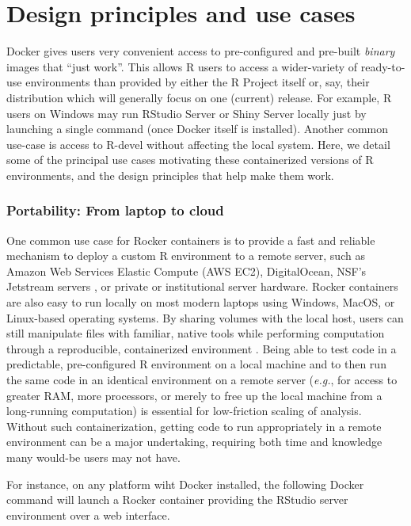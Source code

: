 \section{Design principles and use
cases}\label{design-principles-and-use-cases}

Docker gives users very convenient access to pre-configured and
pre-built \emph{binary} images that ``just work''. This allows R users
to access a wider-variety of ready-to-use environments than provided by
either the R Project itself or, say, their distribution which will
generally focus on one (current) release. For example, R users on
Windows may run RStudio\textsuperscript{\textregistered} Server or
Shiny\textsuperscript{\textregistered} Server locally just by launching
a single command (once Docker itself is installed). Another common
use-case is access to R-devel without affecting the local system. Here,
we detail some of the principal use cases motivating these containerized
versions of R environments, and the design principles that help make
them work.

\subsubsection{Portability: From laptop to
cloud}\label{portability-from-laptop-to-cloud}

One common use case for Rocker containers is to provide a fast and
reliable mechanism to deploy a custom R environment to a remote server,
such as Amazon Web Services Elastic Compute (AWS EC2), DigitalOcean,
NSF's Jetstream servers \citep{jetstream}, or private or institutional
server hardware. Rocker containers are also easy to run locally on most
modern laptops using Windows, MacOS, or Linux-based operating systems.
By sharing volumes with the local host, users can still manipulate files
with familiar, native tools while performing computation through a
reproducible, containerized environment \citep{Boettiger2015}. Being
able to test code in a predictable, pre-configured R environment on a
local machine and to then run the same code in an identical environment
on a remote server (\emph{e.g.}, for access to greater RAM, more
processors, or merely to free up the local machine from a long-running
computation) is essential for low-friction scaling of analysis. Without
such containerization, getting code to run appropriately in a remote
environment can be a major undertaking, requiring both time and
knowledge many would-be users may not have.

For instance, on any platform wiht Docker installed, the following
Docker command will launch a Rocker container providing the
RStudio\textsuperscript{\textregistered} server environment over a web
interface.


